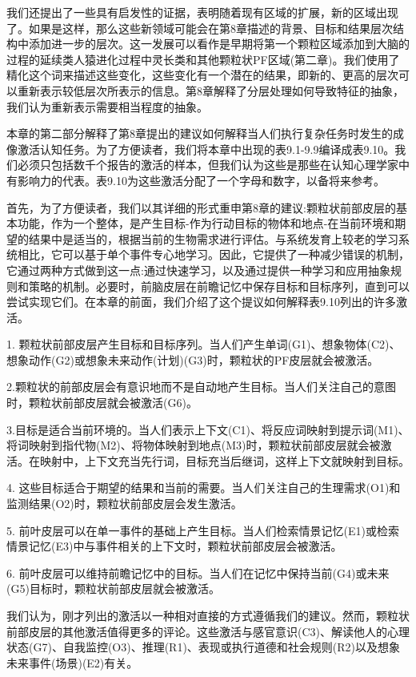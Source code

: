 我们还提出了一些具有启发性的证据，表明随着现有区域的扩展，新的区域出现了。如果是这样，那么这些新领域可能会在第8章描述的背景、目标和结果层次结构中添加进一步的层次。这一发展可以看作是早期将第一个颗粒区域添加到大脑的过程的延续类人猿进化过程中灵长类和其他颗粒状PF区域(第二章)。我们使用了精化这个词来描述这些变化，这些变化有一个潜在的结果，即新的、更高的层次可以重新表示较低层次所表示的信息。第8章解释了分层处理如何导致特征的抽象，我们认为重新表示需要相当程度的抽象。

本章的第二部分解释了第8章提出的建议如何解释当人们执行复杂任务时发生的成像激活认知任务。为了方便读者，我们将本章中出现的表9.1-9.9编译成表9.10。我们必须只包括数千个报告的激活的样本，但我们认为这些是那些在认知心理学家中有影响力的代表。表9.10为这些激活分配了一个字母和数字，以备将来参考。

首先，为了方便读者，我们以其详细的形式重申第8章的建议:颗粒状前部皮层的基本功能，作为一个整体，是产生目标-作为行动目标的物体和地点-在当前环境和期望的结果中是适当的，根据当前的生物需求进行评估。与系统发育上较老的学习系统相比，它可以基于单个事件专心地学习。因此，它提供了一种减少错误的机制，它通过两种方式做到这一点:通过快速学习，以及通过提供一种学习和应用抽象规则和策略的机制。必要时，前脑皮层在前瞻记忆中保存目标和目标序列，直到可以尝试实现它们。在本章的前面，我们介绍了这个提议如何解释表9.10列出的许多激活。

1. 颗粒状前部皮层产生目标和目标序列。当人们产生单词(G1)、想象物体(C2)、想象动作(G2)或想象未来动作(计划)(G3)时，颗粒状的PF皮层就会被激活。

2.颗粒状的前部皮层会有意识地而不是自动地产生目标。当人们关注自己的意图时，颗粒状前部皮层就会被激活(G6)。

3.目标是适合当前环境的。当人们表示上下文(C1)、将反应词映射到提示词(M1)、将词映射到指代物(M2)、将物体映射到地点(M3)时，颗粒状前部皮层就会被激活。在映射中，上下文充当先行词，目标充当后继词，这样上下文就映射到目标。

4. 这些目标适合于期望的结果和当前的需要。当人们关注自己的生理需求(O1)和监测结果(O2)时，颗粒状前部皮层会发生激活。

5. 前叶皮层可以在单一事件的基础上产生目标。当人们检索情景记忆(E1)或检索情景记忆(E3)中与事件相关的上下文时，颗粒状前部皮层会被激活。

6. 前叶皮层可以维持前瞻记忆中的目标。当人们在记忆中保持当前(G4)或未来(G5)目标时，颗粒状前部皮层就会被激活。

我们认为，刚才列出的激活以一种相对直接的方式遵循我们的建议。然而，颗粒状前部皮层的其他激活值得更多的评论。这些激活与感官意识(C3)、解读他人的心理状态(G7)、自我监控(O3)、推理(R1)、表现或执行道德和社会规则(R2)以及想象未来事件(场景)(E2)有关。

